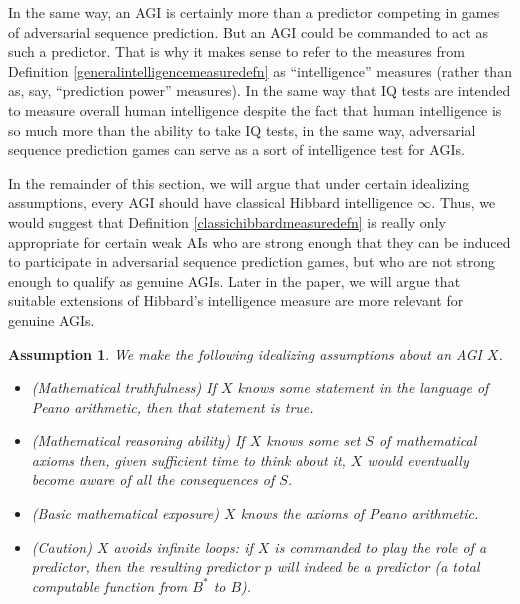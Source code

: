 \documentclass{article}
\newtheorem{assumption}[theorem]{Assumption}
\begin{document}
In the same way, an AGI is certainly more than a predictor competing in
games of adversarial sequence prediction. But an AGI could be commanded to
act as such a predictor. That is why it makes sense to refer to the measures
from Definition \ref{generalintelligencemeasuredefn} as ``intelligence'' measures
(rather than as, say, ``prediction power'' measures). In the same way that
IQ tests are intended to measure overall human intelligence despite the fact that
human intelligence is so much more than the ability to take IQ tests, in the same
way, adversarial sequence prediction games can serve as a sort of intelligence
test for AGIs.

In the remainder of this section, we will argue that under certain idealizing
assumptions, every AGI should have classical Hibbard intelligence $\infty$.
Thus, we would suggest that Definition \ref{classichibbardmeasuredefn} is really
only appropriate for certain weak AIs who are strong enough that they can be
induced to participate in adversarial sequence prediction games, but who are
not strong enough to qualify as genuine AGIs. Later in the paper, we will argue
that suitable extensions of Hibbard's intelligence measure are more relevant
for genuine AGIs.

\begin{assumption}
\label{idealizingassumption}
    We make the following idealizing assumptions about an AGI $X$.
    \begin{itemize}
        \item
        (Mathematical truthfulness) If $X$ knows some statement in the language
        of Peano arithmetic, then that statement is true.
        \item
        (Mathematical reasoning ability) If $X$ knows some set $S$ of mathematical
        axioms then, given sufficient time to think about it, $X$ would eventually
        become aware of all the consequences of $S$.
        \item
        (Basic mathematical exposure) $X$ knows the axioms of Peano arithmetic.
        \item
        (Caution) $X$ avoids infinite loops: if $X$ is commanded to play the
        role of a predictor, then the resulting predictor $p$ will indeed
        be a predictor (a total computable function
        from $B^*$ to $B$).
    \end{itemize}
\end{assumption}
\end{document}
